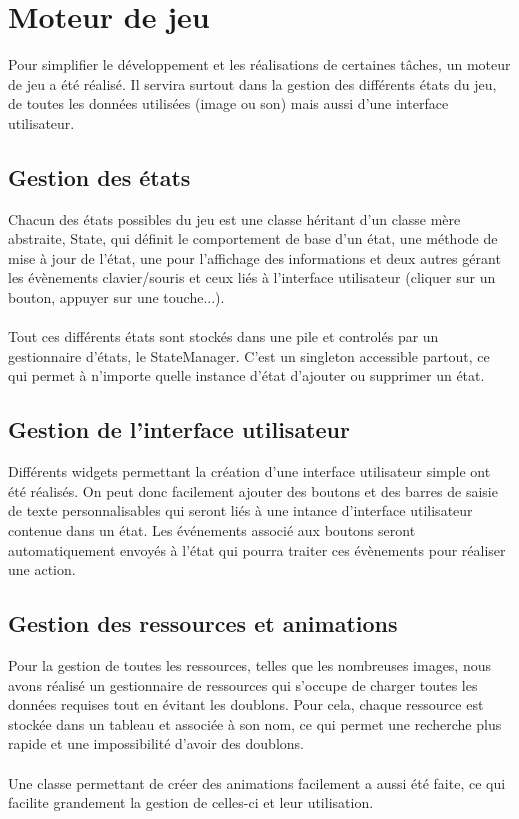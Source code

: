 \documentclass[a4paper]{memoir}
\begin{document}
		\section{Moteur de jeu}
			Pour simplifier le développement et les réalisations de certaines tâches, un moteur de jeu a été réalisé. Il servira surtout dans la gestion des différents états du jeu, de toutes les données utilisées (image ou son) mais aussi d'une interface utilisateur.
		
			\subsection{Gestion des états}
				Chacun des états possibles du jeu est une classe héritant d'un classe mère abstraite, State, qui définit le comportement de base d'un état, une méthode de mise à jour de l'état, une pour l'affichage des informations et deux autres gérant les évènements clavier/souris et ceux liés à l'interface utilisateur (cliquer sur un bouton, appuyer sur une touche...).\\
				\\
				Tout ces différents états sont stockés dans une pile et controlés par un gestionnaire d'états, le StateManager. C'est un singleton accessible partout, ce qui permet à n'importe quelle instance d'état d'ajouter ou supprimer un état.
			
			\subsection{Gestion de l'interface utilisateur}
				Différents widgets permettant la création d'une interface utilisateur simple ont été réalisés. On peut donc facilement ajouter des boutons et des barres de saisie de texte personnalisables qui seront liés à une intance d'interface utilisateur contenue dans un état. Les événements associé aux boutons seront automatiquement envoyés à l'état qui pourra traiter ces évènements pour réaliser une action.
			
			\subsection{Gestion des ressources et animations}
				Pour la gestion de toutes les ressources, telles que les nombreuses images, nous avons réalisé un gestionnaire de ressources qui s'occupe de charger toutes les données requises tout en évitant les doublons. Pour cela, chaque ressource est stockée dans un tableau et associée à son nom, ce qui permet une recherche plus rapide et une impossibilité d'avoir des doublons.\\
				\\
				Une classe permettant de créer des animations facilement a aussi été faite, ce qui facilite grandement la gestion de celles-ci et leur utilisation.
				
\end{document}
